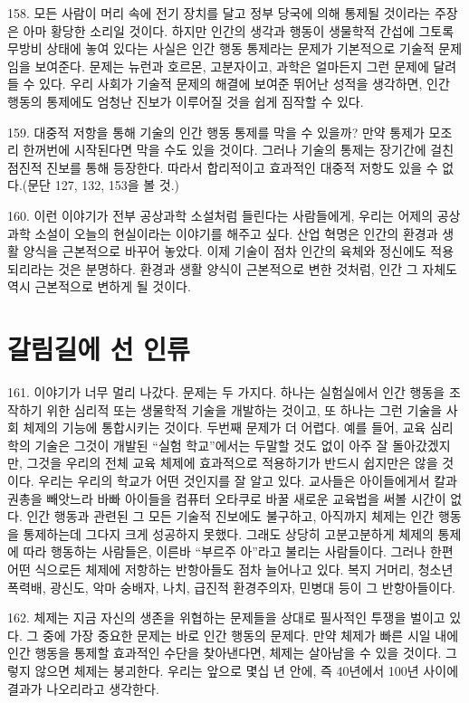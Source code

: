 \documentclass[11pt,a4paper]{article}
\begin{document}
\begin{multicols}{2}
158. 모든 사람이 머리 속에 전기 장치를 달고 정부 당국에 의해 통제될 것이라는 주장은 아마 황당한  소리일 것이다. 하지만 인간의 생각과 행동이 생물학적 간섭에 그토록 무방비 상태에 놓여 있다는 사실은  인간 행동 통제라는 문제가 기본적으로 기술적 문제임을 보여준다. 문제는 뉴런과 호르몬, 고분자이고,  과학은 얼마든지 그런 문제에 달려들 수 있다. 우리 사회가 기술적 문제의 해결에 보여준 뛰어난 성적을  생각하면, 인간 행동의 통제에도 엄청난 진보가 이루어질 것을 쉽게 짐작할 수 있다.  


159. 대중적 저항을 통해 기술의 인간 행동 통제를 막을 수 있을까? 만약 통제가 모조리 한꺼번에  시작된다면 막을 수도 있을 것이다. 그러나 기술의 통제는 장기간에 걸친 점진적 진보를 통해 등장한다.  따라서 합리적이고 효과적인 대중적 저항도 있을 수 없다.(문단 127, 132, 153을 볼 것.)  


160. 이런 이야기가 전부 공상과학 소설처럼 들린다는 사람들에게, 우리는 어제의 공상과학 소설이  오늘의 현실이라는 이야기를 해주고 싶다. 산업 혁명은 인간의 환경과 생활 양식을 근본적으로 바꾸어  놓았다. 이제 기술이 점차 인간의 육체와 정신에도 적용되리라는 것은 분명하다. 환경과 생활 양식이  근본적으로 변한 것처럼, 인간 그 자체도 역시 근본적으로 변하게 될 것이다. 


\section*{갈림길에 선 인류} 
161. 이야기가 너무 멀리 나갔다. 문제는 두 가지다. 하나는 실험실에서 인간 행동을 조작하기 위한  심리적 또는 생물학적 기술을 개발하는 것이고, 또 하나는 그런 기술을 사회 체제의 기능에 통합시키는  것이다. 두번째 문제가 더 어렵다. 예를 들어, 교육 심리학의 기술은 그것이 개발된 “실험 학교”에서는  두말할 것도 없이 아주 잘 돌아갔겠지만, 그것을 우리의 전체 교육 체제에 효과적으로 적용하기가 반드시  쉽지만은 않을 것이다. 우리는 우리의 학교가 어떤 것인지를 잘 알고 있다. 교사들은 아이들에게서 칼과  권총을 빼앗느라 바빠 아이들을 컴퓨터 오타쿠로 바꿀 새로운 교육법을 써볼 시간이 없다. 인간 행동과  관련된 그 모든 기술적 진보에도 불구하고, 아직까지 체제는 인간 행동을 통제하는데 그다지 크게  성공하지 못했다. 그래도 상당히 고분고분하게 체제의 통제에 따라 행동하는 사람들은, 이른바 “부르주 아”라고 불리는 사람들이다. 그러나 한편 어떤 식으로든 체제에 저항하는 반항아들도 점차 늘어나고 있다. 복지 거머리, 청소년 폭력배, 광신도, 악마 숭배자, 나치, 급진적 환경주의자, 민병대 등이 그  반항아들이다.  


162. 체제는 지금 자신의 생존을 위협하는 문제들을 상대로 필사적인 투쟁을 벌이고 있다. 그 중에 가장  중요한 문제는 바로 인간 행동의 문제다. 만약 체제가 빠른 시일 내에 인간 행동을 통제할 효과적인  수단을 찾아낸다면, 체제는 살아남을 수 있을 것이다. 그렇지 않으면 체제는 붕괴한다. 우리는 앞으로  몇십 년 안에, 즉 40년에서 100년 사이에 결과가 나오리라고 생각한다.  



\end{multicols}
\end{document}

